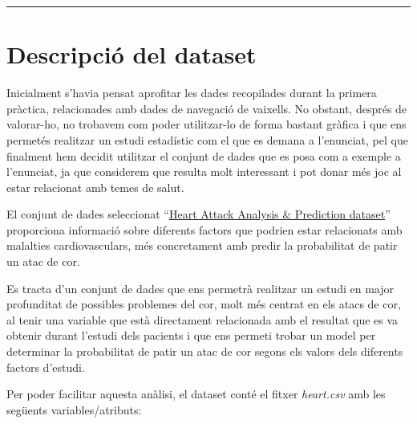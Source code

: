 \documentclass[
]{article}
\begin{document}
\begin{center}\rule{0.5\linewidth}{0.5pt}\end{center}

\hypertarget{descripciuxf3-del-dataset}{%
\section{Descripció del dataset}\label{descripciuxf3-del-dataset}}

Inicialment s'havia pensat aprofitar les dades recopilades durant la
primera pràctica, relacionades amb dades de navegació de vaixells. No
obstant, després de valorar-ho, no trobavem com poder utilitzar-lo de
forma bastant gràfica i que ens permetés realitzar un estudi estadístic
com el que es demana a l'enunciat, pel que finalment hem decidit
utilitzar el conjunt de dades que es posa com a exemple a l'enunciat, ja
que considerem que resulta molt interessant i pot donar més joc al estar
relacionat amb temes de salut.

El conjunt de dades seleccionat
``\href{https://www.kaggle.com/datasets/rashikrahmanpritom/heart-attack-analysis-prediction-dataset}{Heart
Attack Analysis \& Prediction dataset}'' proporciona informació sobre
diferents factors que podrien estar relacionats amb malalties
cardiovasculars, més concretament amb predir la probabilitat de patir un
atac de cor.

Es tracta d'un conjunt de dades que ens permetrà realitzar un estudi en
major profunditat de possibles problemes del cor, molt més centrat en
els atacs de cor, al tenir una variable que està directament relacionada
amb el resultat que es va obtenir durant l'estudi dels pacients i que
ens permeti trobar un model per determinar la probabilitat de patir un
atac de cor segons els valors dels diferents factors d'estudi.

Per poder facilitar aquesta anàlisi, el dataset conté el fitxer
\emph{heart.csv} amb les següents variables/atributs:
\end{document}

